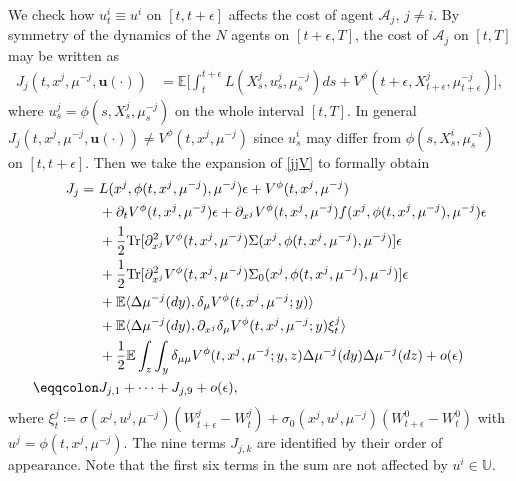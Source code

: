 \documentclass{amsart}
\theoremstyle{definition}
\theoremstyle{remark}
\def\cal{\mathcal}
\def\EE{{\mathbb E}}
\def\deltae{\epsilon}
\numberwithin{equation}{section}
\begin{document}
We check how $u_t^i\equiv u^i$ on $[t, t+\deltae]$ affects the cost of
agent ${\cal A}_j$, $j\ne i$. By symmetry of the dynamics of the $N$ agents on  $[t+\deltae, T]$, the cost of
${\cal A}_j$ on $[t, T]$  may be written as
\begin{align}
J_j(t, x^j, \mu^{-j}, {\mathbf u}(\cdot))&=\EE\Big[ \int_t^{t+\deltae}
L(X_s^j,u_s^j,
\mu_s^{-j} )ds+
V^\phi({t+\deltae}, X^j_{t+\deltae}, \mu^{-j}_{t+\deltae} ) \Big],\label{jjV}
\end{align}
where $u_s^j=\phi(s, X_s^j, \mu_s^{-j})$
on the whole interval $[t,T]$. In general $J_j(t,x^j,\mu^{-j}, {\mathbf u}(\cdot))\ne V^\phi(t, x^j, \mu^{-j})$ since $u^i_s$ may differ from  $\phi(s, X_s^i, \mu_s^{-i})$ on $[t, t+\deltae]$.
Then we take the expansion of \eqref{jjV} to formally  obtain
\begin{align}
J_j =\ & L(x^j,  \phi(t,x^j,\mu^{-j}),\mu^{-j}) \deltae+ V^\phi(t, x^j,
\mu^{-j})  \notag   \\
  & +  \partial_t V^\phi(t, x^j, \mu^{-j}) \deltae
  + \partial_{x^j} V^\phi (t, x^j, \mu^{-j})
f(x^j, \phi(t,x^j,\mu^{-j}), \mu^{-j}) \deltae  \notag \\
  & + \frac{1}{2} {\rm Tr}
[\partial^2_{x^j} V^\phi(t, x^j, \mu^{-j}) \Sigma  (x^j,\phi(t,x^j,\mu^{-j}),\mu^{-j}  ) ]\deltae  \notag \\
&+ \frac{1}{2} {\rm Tr}
[\partial^2_{x^j} V^\phi(t, x^j, \mu^{-j}) \Sigma_0  (x^j,\phi(t,x^j,\mu^{-j}),\mu^{-j}  ) ]\deltae  \notag  \\
&+ \EE\langle \Delta\mu^{-j}(dy), \delta_{\mu} V^\phi(t, x^j, \mu^{-j}; y) \rangle \notag  \\
&+  \EE \langle \Delta\mu^{-j} (dy),   \partial_{x^j}\delta_\mu V^\phi (t, x^j, \mu^{-j}; y)\xi_t^j \rangle  \notag  \\
&+ \frac{1}{2}\EE\int_z\int_y \delta_{\mu\mu} V^\phi (t, x^j, \mu^{-j}; y,z)\Delta \mu^{-j} (dy) \Delta\mu^{-j} (dz)+o(\deltae)  \notag \\
  \eqqcolon & J_{j,1}+\cdots+J_{j,9}+o(\deltae), \notag
\end{align}
where
$
\xi_t^j\coloneqq \sigma(x^j,u^j,\mu^{-j})(W_{t+\epsilon}^j-W_t^j)+ \sigma_0(x^j, u^j,\mu^{-j})(W_{t+\deltae}^0-W_t^0)
$ with $u^j=\phi(t, x^j, \mu^{-j})$. The nine terms $J_{j,k}$ are identified by their order of appearance. Note that the first six terms in the sum are not affected by   $u^i\in \mathbb{U}$.
\end{document}
